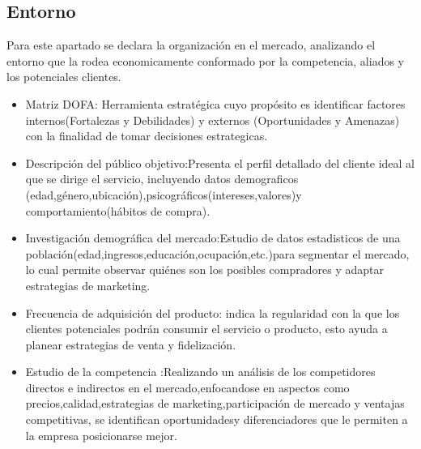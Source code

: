 
\subsection{Entorno}
    Para este apartado se declara la organización en el mercado, analizando el entorno que la rodea economicamente conformado por la competencia, aliados y los potenciales clientes.
    \begin{itemize}
        \item Matriz DOFA: Herramienta estratégica cuyo propósito es identificar factores internos(Fortalezas y Debilidades) y externos (Oportunidades y Amenazas) con la finalidad de tomar decisiones estrategicas.
        \item Descripción del público objetivo:Presenta el perfil detallado del cliente ideal al que se dirige el servicio, incluyendo datos demograficos (edad,género,ubicación),psicográficos(intereses,valores)y comportamiento(hábitos de compra).
        \item Investigación demográfica del mercado:Estudio de datos estadisticos de una población(edad,ingresos,educación,ocupación,etc.)para segmentar el mercado, lo cual permite observar quiénes son los posibles compradores y adaptar estrategias de marketing.
        \item Frecuencia de adquisición del producto: indica la regularidad con la que los clientes potenciales podrán consumir el servicio o producto, esto ayuda a planear estrategias de venta y fidelización.
        \item Estudio de la competencia :Realizando un análisis de los competidores directos e indirectos en el mercado,enfocandose en aspectos como precios,calidad,estrategias de marketing,participación de mercado y ventajas competitivas, se identifican oportunidadesy diferenciadores que le permiten a la empresa posicionarse mejor.
         
    \end{itemize}
